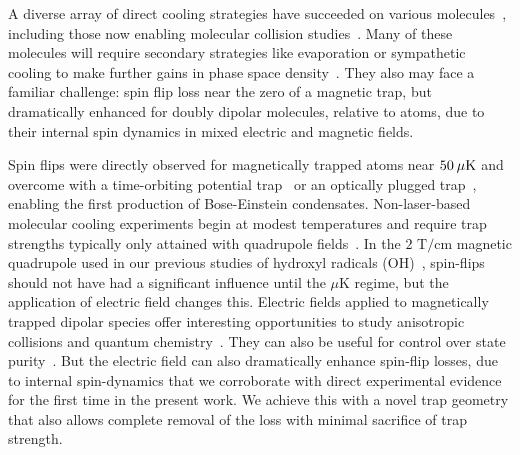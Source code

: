 A diverse array of direct cooling strategies have succeeded on various molecules~\cite{Weinstein1998, Bethlem1999, Bochinski2003, Narevicius2008, Wiederkehr2012, Marx2015, Prehn2016, Liu2017a}, including those now enabling molecular collision studies~\cite{Sawyer2011, Zastrow2014, Klein2016, Wu2017}.
Many of these molecules will require secondary strategies like evaporation or sympathetic cooling to make further gains in phase space density~\cite{Parazzoli2011, Stuhl2012evap, Quemener2016}.
They also may face a familiar challenge: spin flip loss near the zero of a magnetic trap, but dramatically enhanced for doubly dipolar molecules, relative to atoms, due to their internal spin dynamics in mixed electric and magnetic fields.

Spin flips were directly observed for magnetically trapped atoms near $50{\nobreak\hspace{.2em}}\mu\text{K}$ and overcome with a time-orbiting potential trap~\cite{Petrich1995} or an optically plugged trap~\cite{Davis1995}, enabling the first production of Bose-Einstein condensates.
Non-laser-based molecular cooling experiments begin at modest temperatures and require trap strengths typically only attained with quadrupole fields~\cite{Weinstein1998, Sawyer2008, Riedel2011, Quintero-Perez2014, Akerman2017}.
In the $2\text{ T/cm}$ magnetic quadrupole used in our previous studies of hydroxyl radicals (OH)~\cite{Stuhl2012evap}, spin-flips should not have had a significant influence until the $\mu$K regime, but the application of electric field changes this.
Electric fields applied to magnetically trapped dipolar species offer interesting opportunities to study anisotropic collisions and quantum chemistry~\cite{Stuhl2013}.
They can also be useful for control over state purity~\cite{Stuhl2012uwave}.
But the electric field can also dramatically enhance spin-flip losses, due to internal spin-dynamics that we corroborate with direct experimental evidence for the first time in the present work.
We achieve this with a novel trap geometry that also allows complete removal of the loss with minimal sacrifice of trap strength.

